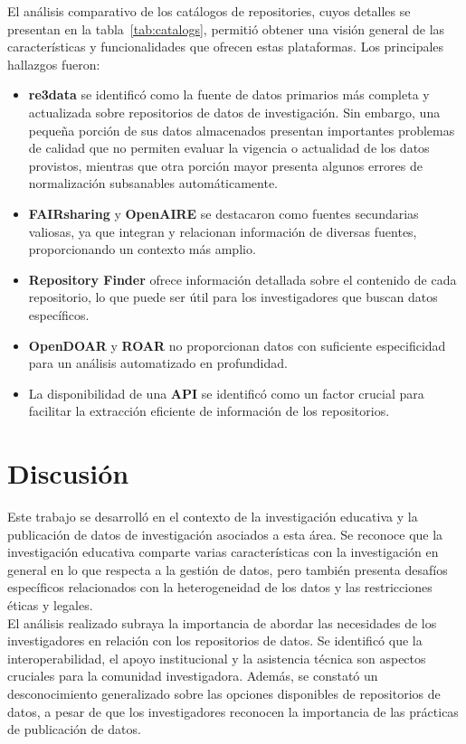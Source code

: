 \documentclass[runningheads]{llncs}
\begin{document}
El análisis comparativo de los catálogos de repositories, cuyos detalles se presentan en la tabla~\ref{tab:catalogs}, permitió obtener una visión general de las características y funcionalidades que ofrecen estas plataformas. Los principales hallazgos fueron:
\begin{itemize}
    \item \textbf{re3data} se identificó como la fuente de datos primarios más completa y actualizada sobre repositorios de datos de investigación. Sin embargo, una pequeña porción de sus datos almacenados presentan importantes problemas de calidad que no permiten evaluar la vigencia o actualidad de los datos provistos, mientras que otra porción mayor presenta algunos errores de normalización subsanables automáticamente.
    \item \textbf{FAIRsharing} y \textbf{OpenAIRE} se destacaron como fuentes secundarias valiosas, ya que integran y relacionan información de diversas fuentes, proporcionando un contexto más amplio.
    \item \textbf{Repository Finder} ofrece información detallada sobre el contenido de cada repositorio, lo que puede ser útil para los investigadores que buscan datos específicos.
    \item \textbf{OpenDOAR} y \textbf{ROAR} no proporcionan datos con suficiente especificidad para un análisis automatizado en profundidad.
    \item La disponibilidad de una \textbf{API} se identificó como un factor crucial para facilitar la extracción eficiente de información de los repositorios.
\end{itemize}

\section{Discusión}

Este trabajo se desarrolló en el contexto de la investigación educativa y la publicación de datos de investigación asociados a esta área. Se reconoce que la investigación educativa comparte varias características con la investigación en general en lo que respecta a la gestión de datos, pero también presenta desafíos específicos relacionados con la heterogeneidad de los datos y las restricciones éticas y legales.\\

El análisis realizado subraya la importancia de abordar las necesidades de los investigadores en relación con los repositorios de datos. Se identificó que la interoperabilidad, el apoyo institucional y la asistencia técnica son aspectos cruciales para la comunidad investigadora. Además, se constató un desconocimiento generalizado sobre las opciones disponibles de repositorios de datos, a pesar de que los investigadores reconocen la importancia de las prácticas de publicación de datos.\\
\end{document}
